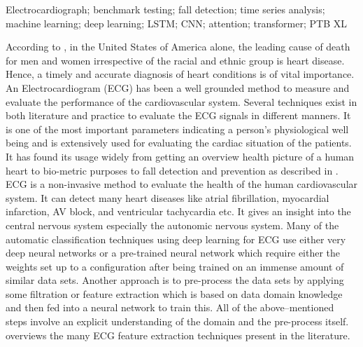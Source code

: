 \documentclass{ieeeaccess}
\begin{document}
\begin{IEEEkeywords}Electrocardiograph; benchmark testing; fall detection; time series analysis; machine learning; deep learning; LSTM; CNN; attention; transformer; PTB XL\end{IEEEkeywords}

\titlepgskip=-15pt

\maketitle

{According to} \cite{cdc}, in the United States of America alone, the leading cause of death for men and women irrespective of the racial and ethnic group is heart disease. Hence, a timely and accurate diagnosis of heart conditions is of vital importance. An Electrocardiogram (ECG) has been a well grounded method to measure and evaluate the performance of the cardiovascular system. Several techniques exist in both literature and practice to evaluate the ECG signals in different manners. It is one of the most important parameters indicating a person's physiological well being and is extensively used for evaluating the cardiac situation of the patients. It has found its usage widely from getting an overview health picture of a human heart to bio-metric purposes to fall detection and prevention as described in \cite{fallcardio}.
ECG is a non-invasive method to evaluate the health of the human cardiovascular system. It can detect many heart diseases like atrial fibrillation, myocardial infarction, AV block, and ventricular tachycardia etc. It gives an insight into the central nervous system especially the autonomic nervous system.
Many of the automatic classification techniques using deep learning for ECG use either very deep neural networks or a pre-trained neural network which require either the weights set up to a configuration after being trained on an immense amount of similar data sets. Another approach is to pre-process the data sets by applying some filtration or feature extraction which is based on data domain knowledge and then fed into a neural network to train this. All of the above--mentioned steps involve an explicit understanding of the domain and the pre-process itself. \cite{karpagachelvi2010ecg} overviews the many ECG feature extraction techniques present in the literature.
\end{document}
